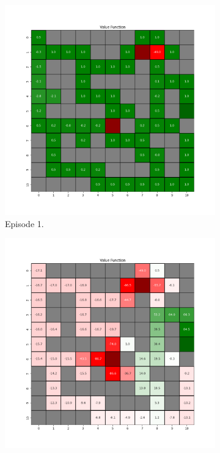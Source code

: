 \documentclass{assignment}
\begin{document}
\begin{figure}[H]
    \begin{subfigure}{0.3\textwidth}
        \includegraphics[width=\textwidth]{figures/value_td/alpha_sweep/value_function_alpha_0.5_gamma_0.95_epsilon_0.2_iteration_1.png}
    \caption{Episode 1.}
    \end{subfigure}\hfill
    \begin{subfigure}{0.3\textwidth}
        \includegraphics[width=\textwidth]{figures/value_td/alpha_sweep/value_function_alpha_0.5_gamma_0.95_epsilon_0.2_iteration_50.png}

\end{subfigure}
\end{figure}
\end{document}
